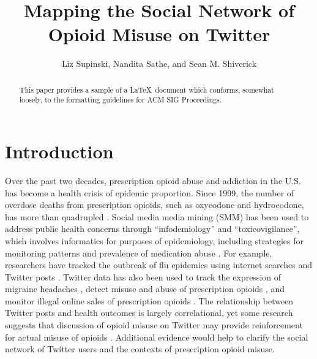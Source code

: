 \documentclass[sigconf]{acmart}
\begin{document}
\title{Mapping the Social Network of Opioid Misuse on Twitter}


\author{Liz Supinski, Nandita Sathe, and Sean M. Shiverick}

\renewcommand{\shortauthors}{Supinski, Sathe, Shiverick}


\begin{abstract}
This paper provides a sample of a \LaTeX\ document which conforms, somewhat 
loosely, to the formatting guidelines for ACM SIG Proceedings.
\end{abstract}


\maketitle


\section{Introduction}

Over the past two decades, prescription opioid abuse and addiction in the U.S. 
has become a health crisis of epidemic proportion. Since 1999, the number of 
overdose deaths from prescription opioids, such as oxycodone and hydrocodone, 
has more than quadrupled \cite{nida18, cdc18}. Social media media mining (SMM) 
has been used to address public health concerns through ``infodemiology'' and 
``toxicovigilance'', which involves informatics for purposes of epidemiology, 
including strategies for monitoring patterns and prevalence of medication abuse 
\cite{eysenbach09, sarker16}. For example, researchers have tracked the outbreak 
of flu epidemics using internet searches and Twitter posts 
\cite{culotta10, paul14, lazer14}. Twitter data has also been used to track 
the expression of migraine headaches \cite{nascimento14}, detect misuse 
and abuse of prescription opioids \cite{sarker16, chary17, dzierak17}, and 
monitor illegal online sales of prescription opioids \cite{mackey17}. 
The relationship between Twitter posts and health outcomes is largely 
correlational, yet some research suggests that discussion of opioid misuse 
on Twitter may provide reinforcement for actual misuse of opioids 
\cite{hanson13}. Additional evidence would help to clarify the social network 
of Twitter users and the contexts of prescription opioid misuse. 
\end{document}
